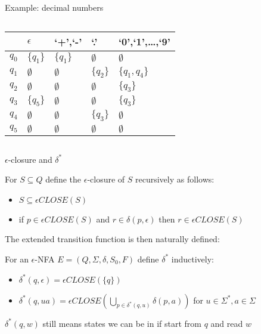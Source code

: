 \documentclass[handout]{beamer}
\begin{document}
\begin{frame}{Example: decimal numbers}
\begin{columns}
        \begin{center}
            \begin{tabular}{c || l | l | l | l}
                & $\epsilon$ & `+',`-' & `.' & `0',`1',\ldots,`9'\\ \hline \hline
                $q_0$ & $\{q_1\}$ & $\{q_1\}$ & $\emptyset$& $\emptyset$\\
                $q_1$  & $\emptyset$& $\emptyset$& $\{q_2\}$ & $\{q_1,q_4\}$\\
                $q_2$  & $\emptyset$& $\emptyset$& $\emptyset$& $\{q_3\}$\\
                $q_3$  & $\{q_5\}$& $\emptyset$& $\emptyset$& $\{q_3\}$\\
                $q_4$  & $\emptyset$& $\emptyset$& $\{q_3\}$& $\emptyset$\\
                $q_5$ & $\emptyset$& $\emptyset$& $\emptyset$& $\emptyset$
            \end{tabular}  
        \end{center}      
        
    \end{columns}
        
\end{frame}


\begin{frame}{$\epsilon$-closure and $\delta^*$}

    For $S\subseteq Q$ define the \alert{$\epsilon$-closure} of $S$ recursively as follows:
    \begin{itemize}
        \item $S\subseteq\epsilon CLOSE(S)$
        \item if $p\in \epsilon CLOSE(S)$ and $r \in \delta(p,\epsilon)$ then $r \in \epsilon CLOSE(S)$
    \end{itemize}

    The extended transition function is then naturally defined:

    \begin{definition}
        For an $\epsilon$-NFA $E=(Q,\Sigma,\delta,S_0,F)$ define $\delta^*$ inductively:
        \begin{itemize}
            \item $\delta^*(q,\epsilon)=\epsilon CLOSE(\{q\})$
            \item $\delta^*(q,ua)=\epsilon CLOSE\left(\bigcup_{p\in\delta^*(q,u)} \delta(p,a)\right)$ for $u\in \Sigma^*, a\in \Sigma$        
        \end{itemize}
    \end{definition}

    $\delta^*(q,w)$ still means states we can be in if start from $q$ and read $w$


    
\end{frame}
\end{document}
